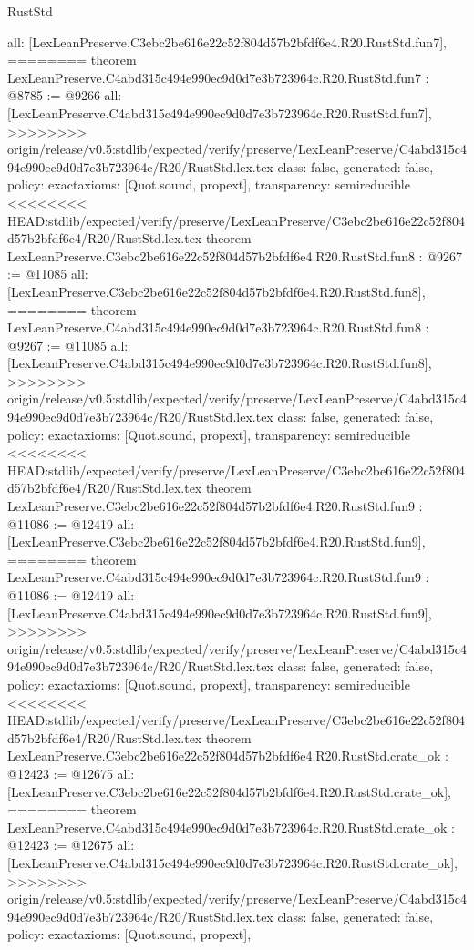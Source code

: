 \begin{lexlean}{RustStd}
\begin{coremodule}
{\begin{coremodule}
{{{{{{{{{{  all: [LexLeanPreserve.C3ebc2be616e22c52f804d57b2bfdf6e4.R20.RustStd.fun7],
========
theorem LexLeanPreserve.C4abd315c494e990ec9d0d7e3b723964c.R20.RustStd.fun7 : @8785 := @9266 {
  all: [LexLeanPreserve.C4abd315c494e990ec9d0d7e3b723964c.R20.RustStd.fun7],
>>>>>>>> origin/release/v0.5:stdlib/expected/verify/preserve/LexLeanPreserve/C4abd315c494e990ec9d0d7e3b723964c/R20/RustStd.lex.tex
  class: false,
  generated: false,
  policy: exact{axioms: [Quot.sound, propext]},
  transparency: semireducible
}
<<<<<<<< HEAD:stdlib/expected/verify/preserve/LexLeanPreserve/C3ebc2be616e22c52f804d57b2bfdf6e4/R20/RustStd.lex.tex
theorem LexLeanPreserve.C3ebc2be616e22c52f804d57b2bfdf6e4.R20.RustStd.fun8 : @9267 := @11085 {
  all: [LexLeanPreserve.C3ebc2be616e22c52f804d57b2bfdf6e4.R20.RustStd.fun8],
========
theorem LexLeanPreserve.C4abd315c494e990ec9d0d7e3b723964c.R20.RustStd.fun8 : @9267 := @11085 {
  all: [LexLeanPreserve.C4abd315c494e990ec9d0d7e3b723964c.R20.RustStd.fun8],
>>>>>>>> origin/release/v0.5:stdlib/expected/verify/preserve/LexLeanPreserve/C4abd315c494e990ec9d0d7e3b723964c/R20/RustStd.lex.tex
  class: false,
  generated: false,
  policy: exact{axioms: [Quot.sound, propext]},
  transparency: semireducible
}
<<<<<<<< HEAD:stdlib/expected/verify/preserve/LexLeanPreserve/C3ebc2be616e22c52f804d57b2bfdf6e4/R20/RustStd.lex.tex
theorem LexLeanPreserve.C3ebc2be616e22c52f804d57b2bfdf6e4.R20.RustStd.fun9 : @11086 := @12419 {
  all: [LexLeanPreserve.C3ebc2be616e22c52f804d57b2bfdf6e4.R20.RustStd.fun9],
========
theorem LexLeanPreserve.C4abd315c494e990ec9d0d7e3b723964c.R20.RustStd.fun9 : @11086 := @12419 {
  all: [LexLeanPreserve.C4abd315c494e990ec9d0d7e3b723964c.R20.RustStd.fun9],
>>>>>>>> origin/release/v0.5:stdlib/expected/verify/preserve/LexLeanPreserve/C4abd315c494e990ec9d0d7e3b723964c/R20/RustStd.lex.tex
  class: false,
  generated: false,
  policy: exact{axioms: [Quot.sound, propext]},
  transparency: semireducible
}
<<<<<<<< HEAD:stdlib/expected/verify/preserve/LexLeanPreserve/C3ebc2be616e22c52f804d57b2bfdf6e4/R20/RustStd.lex.tex
theorem LexLeanPreserve.C3ebc2be616e22c52f804d57b2bfdf6e4.R20.RustStd.crate_ok : @12423 := @12675 {
  all: [LexLeanPreserve.C3ebc2be616e22c52f804d57b2bfdf6e4.R20.RustStd.crate_ok],
========
theorem LexLeanPreserve.C4abd315c494e990ec9d0d7e3b723964c.R20.RustStd.crate_ok : @12423 := @12675 {
  all: [LexLeanPreserve.C4abd315c494e990ec9d0d7e3b723964c.R20.RustStd.crate_ok],
>>>>>>>> origin/release/v0.5:stdlib/expected/verify/preserve/LexLeanPreserve/C4abd315c494e990ec9d0d7e3b723964c/R20/RustStd.lex.tex
  class: false,
  generated: false,
  policy: exact{axioms: [Quot.sound, propext]},
}}}}}}}}}}}}}}
\end{coremodule}}
\end{coremodule}
\end{lexlean}
